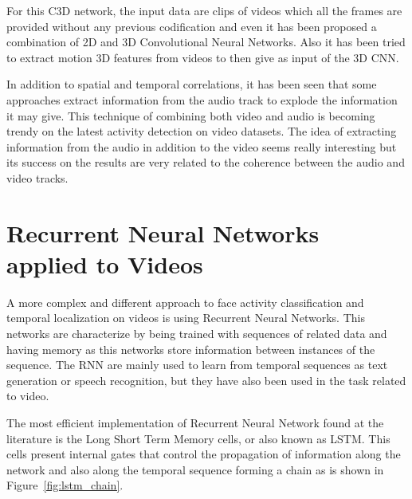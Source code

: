 For this C3D network, the input data are clips of videos which all the frames are provided without any previous codification and even it has been proposed a combination of 2D and 3D Convolutional Neural Networks\cite{Ng_2015_CVPR}\cite{yao2015describing}. Also it has been tried to extract motion 3D features from videos to then give as input of the 3D CNN\cite{yao2015describing}. 




In addition to spatial and temporal correlations, it has been seen that some approaches extract information from the audio track to explode the information it may give. This technique of combining both video and audio is becoming trendy on the latest activity detection on video datasets\cite{xu2015uts}. The idea of extracting information from the audio in addition to the video seems really interesting but its success on the results are very related to the coherence between the audio and video tracks. 


\section{Recurrent Neural Networks applied to Videos}

A more complex and different approach to face activity classification and temporal localization on videos is using Recurrent Neural Networks. This networks are characterize by being trained with sequences of related data and having memory as this networks store information between instances of the sequence. The RNN are mainly used to learn from temporal sequences as text generation or speech recognition, but they have also been used in the task related to video.

The most efficient implementation of Recurrent Neural Network found at the literature is the Long Short Term Memory cells\cite{hochreiter1997long}, or also known as LSTM. This cells present internal gates that control the propagation of information along the network and also along the temporal sequence forming a chain as is shown in Figure~\ref{fig:lstm_chain}.

